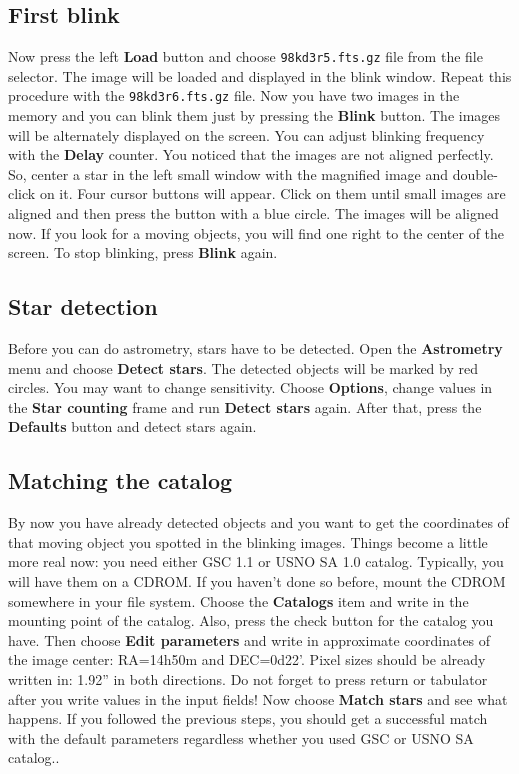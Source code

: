 \documentclass[11pt]{article}
\begin{document}
\subsection{First blink}
Now press the left \textbf{Load} button and choose
\verb=98kd3r5.fts.gz= file from the file selector.  The image will be
loaded and displayed in the blink window.  Repeat this procedure with
the \verb=98kd3r6.fts.gz= file.  Now you have two images in the memory
and you can blink them just by pressing the \textbf{Blink} button.
The images will be alternately displayed on the screen.  You can
adjust blinking frequency with the \textbf{Delay} counter.  You
noticed that the images are not aligned perfectly.  So, center a star
in the left small window with the magnified image and double-click on
it.  Four cursor buttons will appear.  Click on them until small
images are aligned and then press the button with a blue circle.  The
images will be aligned now.  If you look for a moving objects, you
will find one right to the center of the screen. To stop blinking,
press \textbf{Blink} again.

\subsection{Star detection}
Before you can do astrometry, stars have to be detected.  Open the
\textbf{Astrometry} menu and choose \textbf{Detect stars}.  The
detected objects will be marked by red circles.  You may want to
change sensitivity.  Choose \textbf{Options}, change values in the
\textbf{Star counting} frame and run \textbf{Detect stars} again.
After that, press the \textbf{Defaults} button and detect stars again.

\subsection{Matching the catalog}
By now you have already detected objects and you want to get the
coordinates of that moving object you spotted in the blinking images.
Things become a little more real now: you need either GSC 1.1 or USNO
SA 1.0 catalog.  Typically, you will have them on a CDROM.  If you
haven't done so before, mount the CDROM somewhere in your file system.
Choose the \textbf{Catalogs} item and write in the mounting point of
the catalog.  Also, press the check button for the catalog you have.
Then choose \textbf{Edit parameters} and write in approximate
coordinates of the image center: RA=14h50m and DEC=0d22'.  Pixel sizes
should be already written in: 1.92'' in both directions.  Do not
forget to press return or tabulator after you write values in the
input fields!  Now choose \textbf{Match stars} and see what happens.
If you followed the previous steps, you should get a successful match
with the default parameters regardless whether you used GSC or USNO SA
catalog..
\end{document}
